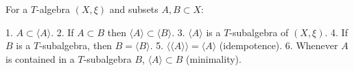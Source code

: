For a $T$-algebra $(X, \xi)$ and subsets $A, B \subset X$:

1. $A \subset \langle A \rangle$.
2. If $A \subset B$ then $\langle A \rangle \subset \langle B \rangle$.
3. $\langle A \rangle$ is a $T$-subalgebra of $(X, \xi)$.
4. If $B$ is a $T$-subalgebra, then $B = \langle B \rangle$.
5. $\langle \langle A \rangle \rangle = \langle A \rangle$ (idempotence).
6. Whenever $A$ is contained in a $T$-subalgebra $B$, $\langle A \rangle \subset B$ (minimality).
